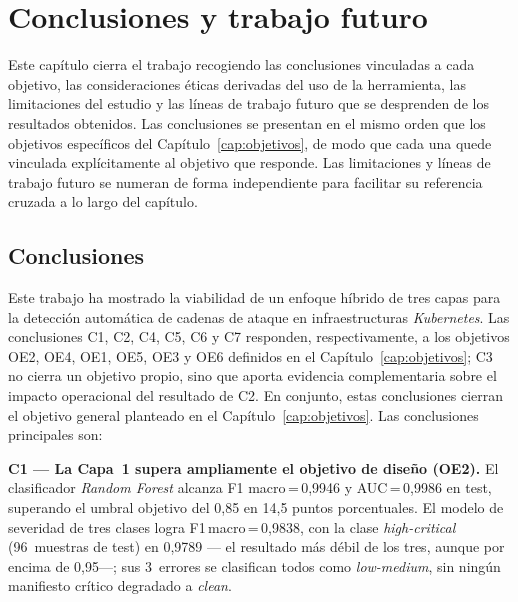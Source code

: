 \chapter{Conclusiones y trabajo futuro}
\label{cap:conclusiones}

Este capítulo cierra el trabajo recogiendo las conclusiones vinculadas a cada
objetivo, las consideraciones éticas derivadas del uso de la herramienta, las
limitaciones del estudio y las líneas de trabajo futuro que se desprenden de
los resultados obtenidos. Las conclusiones se presentan en el mismo orden que
los objetivos específicos del Capítulo~\ref{cap:objetivos}, de modo que cada una
quede vinculada explícitamente al objetivo que responde. Las limitaciones y
líneas de trabajo futuro se numeran de forma independiente para facilitar su
referencia cruzada a lo largo del capítulo.

\section{Conclusiones}

Este trabajo ha mostrado la viabilidad de un enfoque híbrido de tres capas para la
detección automática de cadenas de ataque en infraestructuras \textit{Kubernetes}. Las
conclusiones C1, C2, C4, C5, C6 y C7 responden, respectivamente, a los objetivos OE2,
OE4, OE1, OE5, OE3 y OE6 definidos en el Capítulo~\ref{cap:objetivos}; C3 no cierra un
objetivo propio, sino que aporta evidencia complementaria sobre el impacto operacional
del resultado de C2. En conjunto, estas conclusiones cierran el objetivo general
planteado en el Capítulo~\ref{cap:objetivos}. Las conclusiones principales son:

\textbf{C1 — La Capa~1 supera ampliamente el objetivo de diseño (OE2).} El clasificador
\textit{Random Forest} alcanza F1 macro\,=\,0,9946 y \ac{AUC}\,=\,0,9986 en test, superando
el umbral objetivo del 0,85 en 14,5 puntos porcentuales. El modelo de severidad de
tres clases logra F1\,macro\,=\,0,9838, con la clase \textit{high-critical} (96~muestras
de test) en 0,9789 — el resultado más débil de los tres, aunque por encima de 0,95—;
sus 3~errores se clasifican todos como \textit{low-medium}, sin ningún manifiesto
crítico degradado a \textit{clean}.

